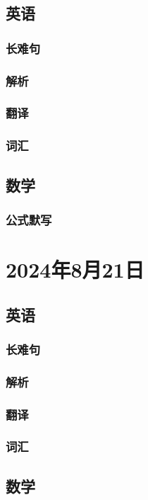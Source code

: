\documentclass[UTF8]{ctexart}
\begin{document}
\subsection{英语}
\subsubsection{长难句}
\subsubsection{解析}
\subsubsection{翻译}
\subsubsection{词汇}
\subsection{数学}
\subsubsection{公式默写}
\begin{multicols}{2}
\end{multicols}
\section{2024年8月21日}
\subsection{英语}
\subsubsection{长难句}
\subsubsection{解析}
\subsubsection{翻译}
\subsubsection{词汇}
\subsection{数学}
\end{document}
